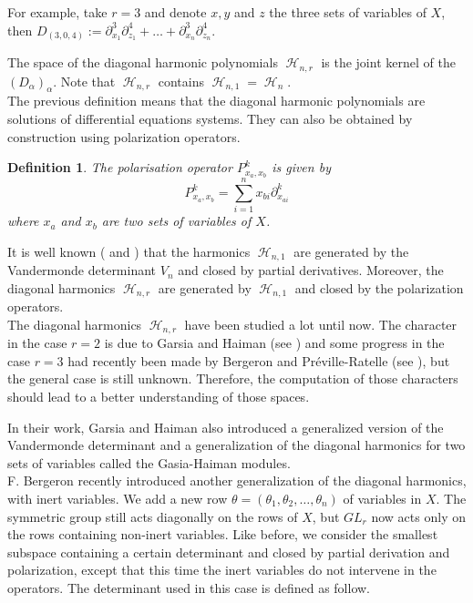\documentclass[letter,12pt]{article}
\DeclareMathOperator{\harmonics}{\mathcal{H}}
\newtheorem{definition}{Definition}
\begin{document}
	For example, take $r=3$ and denote $x, y$ and $z$ the three sets of variables of $X$, then $D_{(3,0,4)} := \partial_{x_1}^3\partial_{z_1}^4 + \dots + \partial_{x_n}^3\partial_{z_n}^4$. 
	
	The space of the diagonal harmonic polynomials $\harmonics_{n,r}$ is the joint kernel of the $(D_\alpha)_\alpha$. Note that $\harmonics_{n,r}$ contains $\harmonics_{n,1} = \harmonics_{n}$.\\
	
	The previous definition means that the diagonal harmonic polynomials are solutions of differential equations systems. They can also be obtained by construction using polarization operators. 
	
	\begin{definition}
		The \emph{polarisation operator} $P_{x_a,x_b}^k$ is given by
		$$P_{x_a,x_b}^k = \sum_{i=1}^{n} x_{bi} \partial_{x_{ai}}^k$$
		where $x_a$ and $x_b$ are two sets of variables of $X$. 
	\end{definition}

	It is well known (\cite{Haiman2002} and \cite{Bergeron2009}) that the harmonics $\harmonics_{n,1}$ are generated by the Vandermonde determinant $V_n$ and closed by partial derivatives. Moreover, the diagonal harmonics $\harmonics_{n,r}$ are generated by $\harmonics_{n,1}$ and closed by the polarization operators. \\

	
	The diagonal harmonics $\harmonics_{n,r}$ have been studied a lot until now. The character in the case $r=2$ is due to Garsia and Haiman (see \cite{GarsiaHaiman1993}) and some progress in the case $r=3$ had recently been made by Bergeron and Préville-Ratelle (see \cite{BergeronPreville2012}), but the general case is still unknown. Therefore, the computation of those characters should lead to a better understanding of those spaces. 
	
	In their work, Garsia and Haiman also introduced a generalized version of the Vandermonde determinant and a generalization of the diagonal harmonics for two sets of variables called the Gasia-Haiman modules. \\
	
	F. Bergeron recently introduced another generalization of the diagonal harmonics, with inert variables. We add a new row $\theta = (\theta_1, \theta_2, \dots, \theta_n)$ of variables in $X$. The symmetric group still acts diagonally on the rows of $X$, but $GL_r$ now acts only on the rows containing non-inert variables. Like before, we consider the smallest subspace containing a certain determinant and closed by partial derivation and polarization, except that this time the inert variables do not intervene in the operators. The determinant used in this case is defined as follow.   
	 
\end{document}
